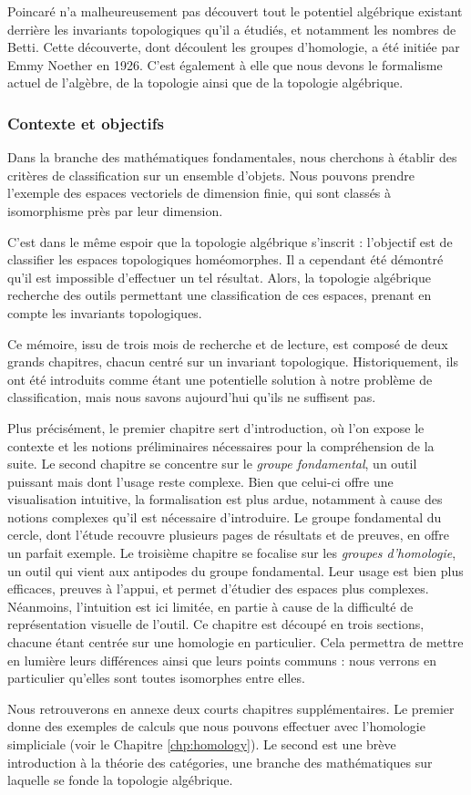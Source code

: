 Poincaré n’a malheureusement pas découvert tout le potentiel algébrique existant derrière les invariants topologiques qu’il a étudiés, et notamment les nombres de Betti. Cette découverte, dont découlent les groupes d’homologie, a été initiée par Emmy Noether en 1926. C’est également à elle que nous devons le formalisme actuel de l’algèbre, de la topologie ainsi que de la topologie algébrique.

\subsubsection{Contexte et objectifs}

Dans la branche des mathématiques fondamentales, nous cherchons à établir des critères de classification sur un ensemble d’objets. Nous pouvons prendre l’exemple des espaces vectoriels de dimension finie, qui sont classés à isomorphisme près par leur dimension.

C’est dans le même espoir que la topologie algébrique s'inscrit : l’objectif est de classifier les espaces topologiques homéomorphes. Il a cependant été démontré \cite{homeoImpossible} qu’il est impossible d’effectuer un tel résultat. Alors, la topologie algébrique recherche des outils permettant une classification de ces espaces, prenant en compte les invariants topologiques.

\bigskip Ce mémoire, issu de trois mois de recherche et de lecture, est composé de deux grands chapitres, chacun centré sur un invariant topologique. Historiquement, ils ont été introduits comme étant une potentielle solution à notre problème de classification, mais nous savons aujourd’hui qu'ils ne suffisent pas.

Plus précisément, le premier chapitre sert d'introduction, où l'on expose le contexte et les notions préliminaires nécessaires pour la compréhension de la suite. Le second chapitre se concentre sur le \emph{groupe fondamental}, un outil puissant mais dont l'usage reste complexe. Bien que celui-ci offre une visualisation intuitive, la formalisation est plus ardue, notamment à cause des notions complexes qu'il est nécessaire d'introduire. Le groupe fondamental du cercle, dont l'étude recouvre plusieurs pages de résultats et de preuves, en offre un parfait exemple. Le troisième chapitre se focalise sur les \emph{groupes d'homologie}, un outil qui vient aux antipodes du groupe fondamental. Leur usage est bien plus efficaces, preuves à l'appui, et permet d'étudier des espaces plus complexes. Néanmoins, l'intuition est ici limitée, en partie à cause de la difficulté de représentation visuelle de l'outil. Ce chapitre est découpé en trois sections, chacune étant centrée sur une homologie en particulier. Cela permettra de mettre en lumière leurs différences ainsi que leurs points communs : nous verrons en particulier qu'elles sont toutes isomorphes entre elles.

Nous retrouverons en annexe deux courts chapitres supplémentaires. Le premier donne des exemples de calculs que nous pouvons effectuer avec l'homologie simpliciale (voir le Chapitre \ref{chp:homology}). Le second est une brève introduction à la théorie des catégories, une branche des mathématiques sur laquelle se fonde la topologie algébrique.
